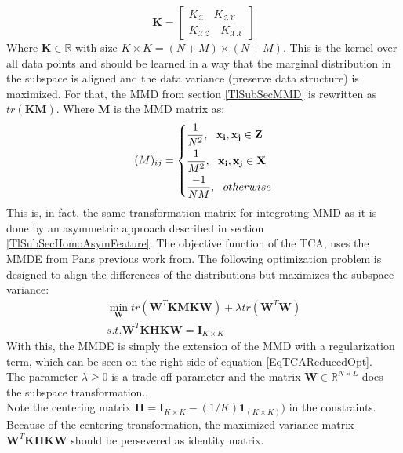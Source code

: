 \begin{equation}\label{EqTCAKernel}
\mathbf{K} = 
	\begin{bmatrix}
	K_{\mathcal{Z}}\>\>\>\> K_{\mathcal{ZX}} \\
	K_{\mathcal{XZ}}\>\>\>\> K_{\mathcal{XX}}
	\end{bmatrix}
\end{equation}
Where $\mathbf{K} \in \mathbb{R}$ with size $K\times K = (N + M) \times (N+ M)$.
This is the kernel over all data points and should be learned in a way that the marginal distribution in the subspace is aligned and the data variance (preserve data structure) is maximized.
For that, the \acs{MMD} from section \ref{TlSubSecMMD} is rewritten as $tr(\mathbf{KM})$.
Where $\mathbf{M}$ is the \acs{MMD} matrix as:\cite{Pan.2011}
\begin{equation}\label{EqTCAMMD}
(M)_{ij}= \begin{dcases}
\frac{1}{N^2},\>\>\> \mathbf{x_i},\mathbf{x_j} \in \mathbf{Z}\\
\frac{1}{M^2},\>\>\> \mathbf{x_i},\mathbf{x_j} \in \mathbf{X}\\
\frac{-1}{NM},\>\>\> otherwise
\end{dcases}
\end{equation}
This is, in fact, the same transformation matrix for integrating \acs{MMD} as it is done by an asymmetric approach described in section \ref{TlSubSecHomoAsymFeature}.
The objective function of the \acs{TCA}, uses the \ac{MMDE} from Pans previous work from\cite{Pan.2008}. The following optimization problem is designed to align the differences of the distributions but maximizes the subspace variance:\cite{Pan.2011}
\begin{equation}\label{EqTCAReducedOpt}
\begin{gathered}
\min_{\mathbf{W}}  tr(\mathbf{W}^T\mathbf{KMKW}) + \lambda tr(\mathbf{W}^T\mathbf{W})\\
s.t. \mathbf{W}^T\mathbf{KHKW} = \mathbf{I}_{K \times K}
\end{gathered}
\end{equation}
With this, the \acs{MMDE} is simply the extension of the \acl{MMD} with a regularization term, which can be seen on the right side of equation \eqref{EqTCAReducedOpt}.\cite{Pan.2011}\\
The parameter $\lambda \ge 0$ is a trade-off parameter and the matrix $\mathbf{W} \in \mathbb{R}^{N\times L}$ does the subspace transformation.\cite{Pan.2011},\\
Note the centering matrix $\mathbf{H} = \mathbf{I}_{K\times K} - (1/K)\mathbf{1}_{(K\times K)})$ in the constraints. Because of the centering transformation, the maximized variance matrix $\mathbf{W}^T\mathbf{KHKW}$ should be persevered as identity matrix.\\

